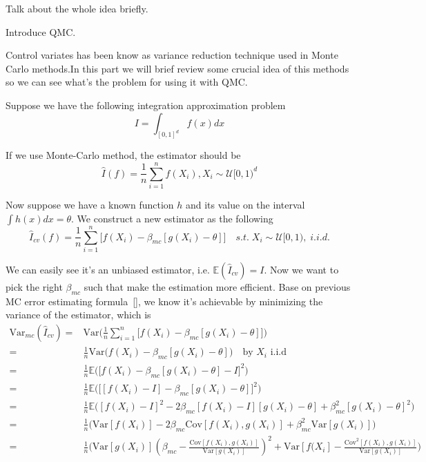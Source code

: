 


Talk about the whole idea briefly.\cite{hickernell2014reliable}


Introduce QMC.


Control variates has been know as variance reduction technique used in Monte Carlo methods.In this part we will brief review some crucial idea of this methods so we can see what's the problem for using it with QMC.\cite{hickernell2005control} 

Suppose we have the following integration approximation problem
\[I= \int_{[0,1]^d}f(x)dx\]

If we use Monte-Carlo method, the estimator should be 
\[
\hat{I}(f)=\frac{1}{n}\sum_{i=1}^{n}f(X_i), X_i\sim \mathcal{U}[0,1)^d
\]

Now suppose we have a known function $h$ and its value on the interval
$\int h(x)dx = \theta$. We construct a new estimator as the following 
\[ \hat{I}_{cv}(f)=\frac{1}{n}\sum_{i=1}^{n}\Big[ f(X_i)-\beta_{mc}[g(X_i)-\theta] \Big] \quad s.t.\; X_i\sim \mathcal{U}[0,1), \; i.i.d.\]

We can easily see it's an unbiased estimator, i.e. $\mathbb{E}(\hat{I}_{cv}) = I$. Now we want to pick the right $\beta_{mc}$ such that make the estimation more efficient. Base on previous MC error estimating formula~\eqref{}, we know it's achievable by minimizing the variance of the estimator, which is 
\begin{align*}
	\mathrm{Var}_{mc}(\hat{I}_{cv})
    =&\mathrm{Var}\Big( \frac{1}{n}\sum_{i=1}^{n}\big[ f(X_i)-\beta_{mc}[g(X_i)-\theta] \big]\Big)\\
    =&\frac{1}{n}\mathrm{Var}\Big(f(X_i)-\beta_{mc}[g(X_i)-\theta]\Big)\quad \text{by $X_i$ i.i.d} \\
    =&\frac{1}{n}\mathbb{E}\Big(\big[f(X_i)-\beta_{mc}[g(X_i)-\theta]-I\big]^2 \Big) \\
    =&\frac{1}{n}\mathbb{E}\Big(\big[ [f(X_i)-I] -\beta_{mc}[g(X_i)-\theta]\big]^2 \Big) \\
    =&\frac{1}{n}\mathbb{E}\big([f(X_i)-I]^2-2\beta_{mc}[f(X_i)-I][g(X_i)-\theta]+\beta_{mc}^2[g(X_i)-\theta]^2 \Big)\\
    =&\frac{1}{n}\Big(\mathrm{Var}[f(X_i)]-2\beta_{mc}\mathrm{Cov}[f(X_i),g(X_i)]+\beta_{mc}^2\mathrm{Var}[g(X_i)]\Big)\\
=&\frac{1}{n}\Big(\mathrm{Var}[g(X_i)](\beta_{mc}-\frac{\mathrm{Cov}[f(X_i),g(X_i)]}{\mathrm{Var}[g(X_i)]})^2+\mathrm{Var}[f(X_i]-\frac{\mathrm{Cov}^2[f(X_i),g(X_i)]}{\mathrm{Var}[g(X_i)]} \Big)
\end{align*}


